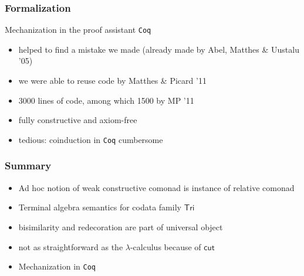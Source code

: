 \documentclass[
serif,
mathsans,
]
{beamer}
\newcommand{\constfont}[1]{\ensuremath{\mathsf{#1}}}
\newcommand{\Tri}{\constfont{Tri}}
\newcommand{\redec}{\constfont{redec}}
\newcommand{\cut}{\constfont{cut}}
\newcommand{\Setoid}{\constfont{Setoid}}
\begin{document}

\begin{comment}
\begin{frame}
 \frametitle{Closing remarks}
 
   \begin{block}{Higher order compatibility}
    Observing that $\Setoid$ is cartesian closed, one can encode
       \[ f \sim g  \Longrightarrow \redec~f \sim \redec~g\]
    in definition of coalgebra for signature of $\Tri$
   \end{block}
\end{frame}
\end{comment}
 
\begin{frame}
  \frametitle{Formalization}
   \begin{block}{Mechanization in the proof assistant \texttt{Coq}}
      \begin{itemize}\setlength{\itemsep}{1em}
       \item helped to find a mistake we made (already made by Abel, Matthes \& Uustalu '05)
       \item we were able to reuse code by Matthes \& Picard '11
       \item 3000 lines of code, among which 1500 by MP '11
       \item fully constructive and axiom-free
       \item tedious: coinduction in \texttt{Coq} cumbersome
      \end{itemize}
   \end{block}

   
\end{frame}

\begin{frame}
 \frametitle{Summary}
  
   \begin{itemize}\setlength{\itemsep}{1em}
    \item Ad hoc notion of weak constructive comonad is instance of relative comonad
    \item Terminal algebra semantics for codata family $\Tri$
    \item bisimilarity and redecoration are part of universal object
    \item not as straightforward as the $\lambda$-calculus because of $\cut$
    \item Mechanization in \texttt{Coq}
   \end{itemize}

\end{frame}
\end{document}
